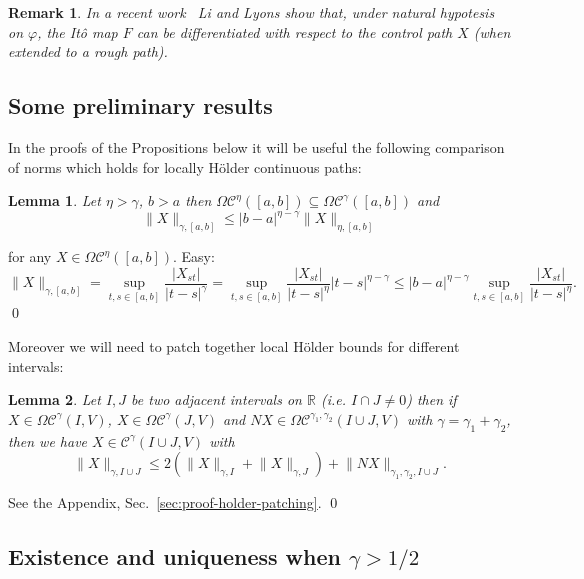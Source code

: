 \documentclass[a4paper,12pt,reqno]{amsproc}
\newcommand{\NN}{N}
\newcommand{\CC}{\mathcal{C}}
\newcommand{\OCC}{\Omega \mathcal{C}}
\newcommand{\norm}[1]{\lVert #1\rVert}
\newcommand{\abs}[1]{\lvert #1\rvert}
\newtheorem{lemma}{Lemma}
\newtheorem{remark}{Remark}
\begin{document}
\begin{remark}
In a recent work~\cite{lilyons} Li and Lyons show that, under natural
hypotesis on $\varphi$, the It\^o map $F$ can be differentiated
with respect to the control path $X$ (when extended to a  rough path).
\end{remark}

\subsection{Some preliminary results}
In the proofs of the Propositions below it will be useful the following
comparison of norms which holds for locally H\"older continuous paths:
\begin{lemma}
\label{lemma:improved_bound}
 Let $\eta > \gamma$, $b>a$ then $\OCC^\eta([a,b]) \subseteq
 \OCC^\gamma([a,b])$ and 
 \begin{equation*}
    \norm{X}_{\gamma,[a,b]} \le |b-a|^{\eta-\gamma} \norm{X}_{\eta,[a,b]}
 \end{equation*}
\end{lemma}
for any $X \in \OCC^\eta([a,b])$.
\proof
Easy:
\begin{equation*}
  \norm{X}_{\gamma,[a,b]}  = \sup_{t,s \in [a,b]}
  \frac{\abs{X_{st}}}{|t-s|^\gamma} = \sup_{t,s \in [a,b]}
  \frac{\abs{X_{st}}}{|t-s|^\eta} |t-s|^{\eta-\gamma} \le
  |b-a|^{\eta-\gamma}  \sup_{t,s \in [a,b]}
  \frac{\abs{X_{st}}}{|t-s|^\eta}.
\end{equation*}
\qed

Moreover we will need to patch together local H\"older bounds for
different intervals:
\begin{lemma}
  \label{eq:holder-patching}
Let $I,J$ be two adjacent intervals on $\mathbb{R}$ (i.e. $I \cap J
\neq 0$) then if $X \in \OCC^{\gamma}(I,V)$, $X \in \OCC^{\gamma}(J,V)
$ and $\NN X \in \OCC^{\gamma_1,\gamma_2}(I \cup J,V)$ with $\gamma =
\gamma_1+\gamma_2$, then we
have $X \in \CC^{\gamma}(I \cup J,V)$ with
\begin{equation}
  \label{eq:patchbound}
  \norm{X}_{\gamma,I \cup J} \le      2
  (\norm{X}_{\gamma,I}+\norm{X}_{\gamma,J}) + \norm{\NN X}_{\gamma_1,\gamma_2,I
  \cup J}.
\end{equation}
\end{lemma}
\proof  See the Appendix, Sec.~\ref{sec:proof-holder-patching}. \qed


\subsection{Existence and uniqueness when $\gamma > 1/2$}
\end{document}
